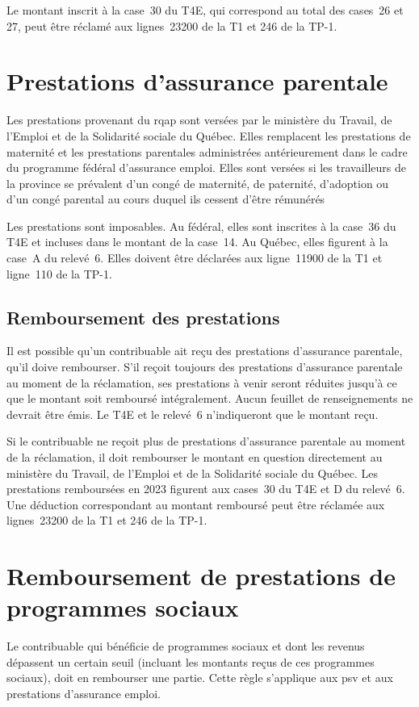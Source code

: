 Le montant inscrit à la case~30 du T4E, qui correspond au total des cases~26 et 27, peut être réclamé aux lignes~23200 de la T1 et 246 de la TP-1.



\section{Prestations d'assurance parentale}
\begin{intro}
	Les prestations provenant du \acrfull{rqap} sont versées par le ministère du Travail, de l'Emploi et de la Solidarité sociale du Québec. Elles remplacent les prestations de maternité et les prestations parentales administrées antérieurement dans le cadre du programme fédéral d'assurance emploi. Elles sont versées si les travailleurs de la province se prévalent d'un congé de maternité, de paternité, d'adoption ou d'un congé parental au cours duquel ils cessent d'être rémunérés
\end{intro}

Les prestations sont imposables. Au fédéral, elles sont inscrites à la case~36 du T4E et incluses dans le montant de la case~14. Au Québec, elles figurent à la case~A du relevé~6. Elles doivent être déclarées aux ligne~11900 de la T1 et ligne~110 de la TP-1. 


\subsection{Remboursement des prestations}
Il est possible qu'un contribuable ait reçu des prestations d'assurance parentale, qu'il doive rembourser. S'il reçoit toujours des prestations d'assurance parentale au moment de la réclamation, ses prestations à venir seront réduites jusqu'à ce que le montant soit remboursé intégralement. Aucun feuillet de renseignements ne devrait être émis. Le T4E et le relevé~6 n'indiqueront que le montant reçu.

Si le contribuable ne reçoit plus de prestations d'assurance parentale au moment de la réclamation, il doit rembourser le montant en question directement au ministère du Travail, de l'Emploi et de la Solidarité sociale du Québec. Les prestations remboursées en 2023 figurent aux cases~30 du T4E et D du relevé~6. Une déduction correspondant au montant remboursé peut être réclamée aux lignes~23200 de la T1 et 246 de la TP-1. 



\section{Remboursement de prestations de programmes sociaux}
\begin{intro}
	Le contribuable qui bénéficie de programmes sociaux et dont les revenus dépassent un certain seuil (incluant les montants reçus de ces programmes sociaux), doit en rembourser une partie. Cette règle s'applique aux \acrfull{psv} et aux prestations d'assurance emploi.
\end{intro}


